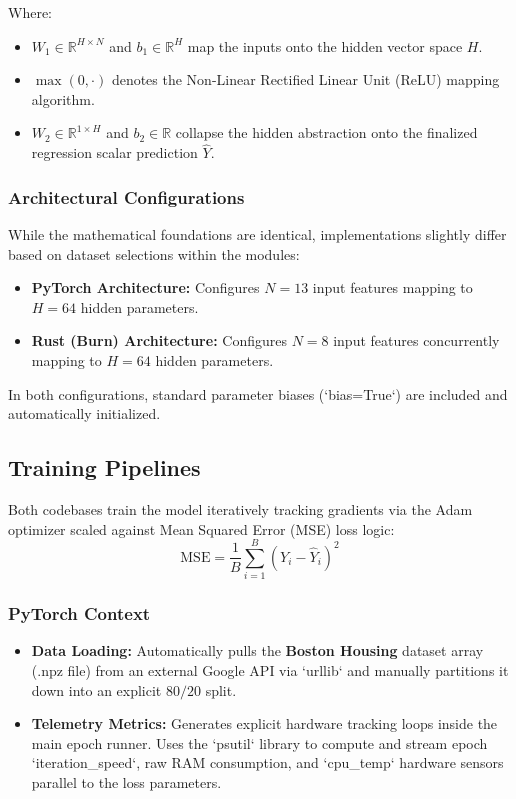 \documentclass[10pt,a4paper,twocolumn]{article}
\begin{document}
Where:
\begin{itemize}
    \item $W_1 \in \mathbb{R}^{H \times N}$ and $b_1 \in \mathbb{R}^H$ map the inputs onto the hidden vector space $H$.
    \item $\max(0, \cdot)$ denotes the Non-Linear Rectified Linear Unit (ReLU) mapping algorithm.
    \item $W_2 \in \mathbb{R}^{1 \times H}$ and $b_2 \in \mathbb{R}$ collapse the hidden abstraction onto the finalized regression scalar prediction $\hat{Y}$.
\end{itemize}

\subsubsection{Architectural Configurations}
While the mathematical foundations are identical, implementations slightly differ based on dataset selections within the modules:
\begin{itemize}
    \item \textbf{PyTorch Architecture:} Configures $N=13$ input features mapping to $H=64$ hidden parameters.
    \item \textbf{Rust (Burn) Architecture:} Configures $N=8$ input features concurrently mapping to $H=64$ hidden parameters.
\end{itemize}
In both configurations, standard parameter biases (`bias=True`) are included and automatically initialized.

\subsection{Training Pipelines}

Both codebases train the model iteratively tracking gradients via the Adam optimizer scaled against Mean Squared Error (MSE) loss logic:
\[ \text{MSE} = \frac{1}{B} \sum_{i=1}^{B} (Y_i - \hat{Y}_i)^2 \]

\subsubsection{PyTorch Context}
\begin{itemize}
    \item \textbf{Data Loading:} Automatically pulls the \textbf{Boston Housing} dataset array (.npz file) from an external Google API via `urllib` and manually partitions it down into an explicit $80/20$ split.
    \item \textbf{Telemetry Metrics:} Generates explicit hardware tracking loops inside the main epoch runner. Uses the `psutil` library to compute and stream epoch `iteration\_speed`, raw RAM consumption, and `cpu\_temp` hardware sensors parallel to the loss parameters.
\end{itemize}
\end{document}
